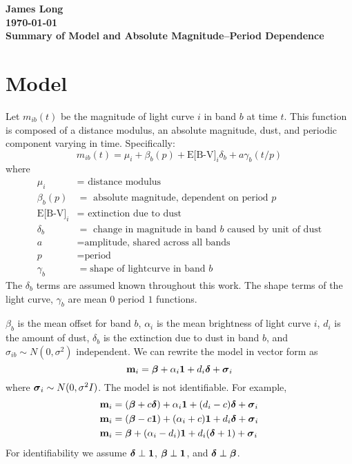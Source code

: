 \documentclass[12pt]{article}
\title{}
\date{}
\author{}
\newcommand{\V}[1]{{\bm{\mathbf{\MakeLowercase{#1}}}}} %
\begin{document}
\noindent
\textbf{James Long}\\
\textbf{\today}\\
\textbf{Summary of Model and Absolute Magnitude--Period Dependence}


\section{Model}

Let $m_{ib}(t)$ be the magnitude of light curve $i$ in band $b$ at time $t$. This function is composed of a distance modulus, an absolute magnitude, dust, and periodic component varying in time. Specifically:
\begin{equation*}
m_{ib}(t) = \mu_i + \beta_{b}(p) + \text{E[B-V]}_i\delta_b + a\gamma_b(t/p)
\end{equation*}
where
\begin{align*}
  \mu_i &= \text{ distance modulus }\\
  \beta_{b}(p) &= \text{ absolute magnitude, dependent on period } p\\
  \text{E[B-V]}_i &= \text{ extinction due to dust }\\
  \delta_b &= \text{ change in magnitude in band $b$ caused by unit of dust}\\
  a &= \text{amplitude, shared across all bands}\\
  p &= \text{period}\\
  \gamma_b &= \text{shape of lightcurve in band $b$}
\end{align*}
The $\delta_b$ terms are assumed known throughout this work. The shape terms of the light curve, $\gamma_b$ are mean 0 period $1$ functions. 


$\beta_b$ is the mean offset for band $b$, $\alpha_i$ is the mean brightness of light curve $i$, $d_i$ is the amount of dust, $\delta_b$ is the extinction due to dust in band $b$, and $\sigma_{ib} \sim N(0,\sigma^2)$ independent. We can rewrite the model in vector form as
\begin{equation*}
\V{m}_i = \V{\beta} + \alpha_i \V{1} + d_i \V{\delta} + \V{\sigma}_i
\end{equation*}
where $\V{\sigma}_i \sim N(0,\sigma^2I)$. The model is not identifiable. For example,
\begin{align*}
\V{m}_i &= (\V{\beta} + c\V{\delta}) + \alpha_i \V{1} + (d_i - c) \V{\delta} + \V{\sigma}_i\\
\V{m}_i &= (\V{\beta} - c\V{1}) + (\alpha_i + c)\V{1} + d_i\V{\delta} + \V{\sigma}_i\\
\V{m}_i &= \V{\beta} + (\alpha_i - d_i)\V{1} + d_i(\V{\delta} + 1) + \V{\sigma}_i\\
\end{align*}
For identifiability we assume $\V{\delta} \perp \V{1}$, $\V{\beta} \perp \V{1}$, and $\V{\delta} \perp \V{\beta}$.



%
%
\end{document}
